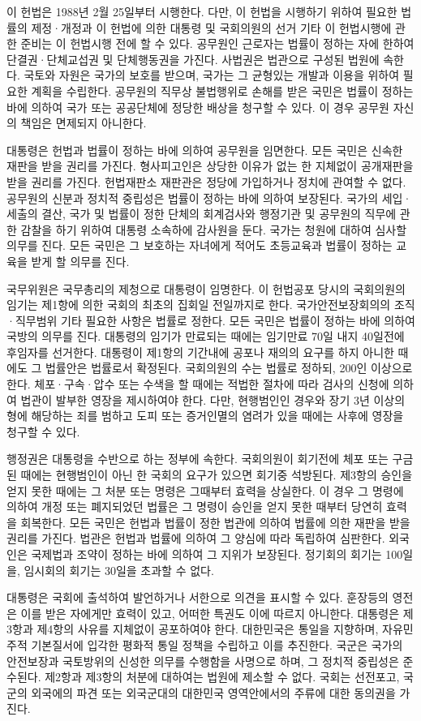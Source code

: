 \documentclass[master, korean]{pnuthesis}
\begin{document}
이 헌법은 1988년 2월 25일부터 시행한다. 다만, 이 헌법을 시행하기 위하여 필요한 법률의 제정·개정과 이 헌법에 의한 대통령 및 국회의원의 선거 기타 이 헌법시행에 관한 준비는 이 헌법시행 전에 할 수 있다. 공무원인 근로자는 법률이 정하는 자에 한하여 단결권·단체교섭권 및 단체행동권을 가진다. 사법권은 법관으로 구성된 법원에 속한다. 국토와 자원은 국가의 보호를 받으며, 국가는 그 균형있는 개발과 이용을 위하여 필요한 계획을 수립한다. 공무원의 직무상 불법행위로 손해를 받은 국민은 법률이 정하는 바에 의하여 국가 또는 공공단체에 정당한 배상을 청구할 수 있다. 이 경우 공무원 자신의 책임은 면제되지 아니한다.

대통령은 헌법과 법률이 정하는 바에 의하여 공무원을 임면한다. 모든 국민은 신속한 재판을 받을 권리를 가진다. 형사피고인은 상당한 이유가 없는 한 지체없이 공개재판을 받을 권리를 가진다. 헌법재판소 재판관은 정당에 가입하거나 정치에 관여할 수 없다. 공무원의 신분과 정치적 중립성은 법률이 정하는 바에 의하여 보장된다. 국가의 세입·세출의 결산, 국가 및 법률이 정한 단체의 회계검사와 행정기관 및 공무원의 직무에 관한 감찰을 하기 위하여 대통령 소속하에 감사원을 둔다. 국가는 청원에 대하여 심사할 의무를 진다. 모든 국민은 그 보호하는 자녀에게 적어도 초등교육과 법률이 정하는 교육을 받게 할 의무를 진다.

국무위원은 국무총리의 제청으로 대통령이 임명한다. 이 헌법공포 당시의 국회의원의 임기는 제1항에 의한 국회의 최초의 집회일 전일까지로 한다. 국가안전보장회의의 조직·직무범위 기타 필요한 사항은 법률로 정한다. 모든 국민은 법률이 정하는 바에 의하여 국방의 의무를 진다. 대통령의 임기가 만료되는 때에는 임기만료 70일 내지 40일전에 후임자를 선거한다. 대통령이 제1항의 기간내에 공포나 재의의 요구를 하지 아니한 때에도 그 법률안은 법률로서 확정된다. 국회의원의 수는 법률로 정하되, 200인 이상으로 한다. 체포·구속·압수 또는 수색을 할 때에는 적법한 절차에 따라 검사의 신청에 의하여 법관이 발부한 영장을 제시하여야 한다. 다만, 현행범인인 경우와 장기 3년 이상의 형에 해당하는 죄를 범하고 도피 또는 증거인멸의 염려가 있을 때에는 사후에 영장을 청구할 수 있다.

행정권은 대통령을 수반으로 하는 정부에 속한다. 국회의원이 회기전에 체포 또는 구금된 때에는 현행범인이 아닌 한 국회의 요구가 있으면 회기중 석방된다. 제3항의 승인을 얻지 못한 때에는 그 처분 또는 명령은 그때부터 효력을 상실한다. 이 경우 그 명령에 의하여 개정 또는 폐지되었던 법률은 그 명령이 승인을 얻지 못한 때부터 당연히 효력을 회복한다. 모든 국민은 헌법과 법률이 정한 법관에 의하여 법률에 의한 재판을 받을 권리를 가진다. 법관은 헌법과 법률에 의하여 그 양심에 따라 독립하여 심판한다. 외국인은 국제법과 조약이 정하는 바에 의하여 그 지위가 보장된다. 정기회의 회기는 100일을, 임시회의 회기는 30일을 초과할 수 없다.

대통령은 국회에 출석하여 발언하거나 서한으로 의견을 표시할 수 있다. 훈장등의 영전은 이를 받은 자에게만 효력이 있고, 어떠한 특권도 이에 따르지 아니한다. 대통령은 제3항과 제4항의 사유를 지체없이 공포하여야 한다. 대한민국은 통일을 지향하며, 자유민주적 기본질서에 입각한 평화적 통일 정책을 수립하고 이를 추진한다. 국군은 국가의 안전보장과 국토방위의 신성한 의무를 수행함을 사명으로 하며, 그 정치적 중립성은 준수된다. 제2항과 제3항의 처분에 대하여는 법원에 제소할 수 없다. 국회는 선전포고, 국군의 외국에의 파견 또는 외국군대의 대한민국 영역안에서의 주류에 대한 동의권을 가진다.
\end{document}
